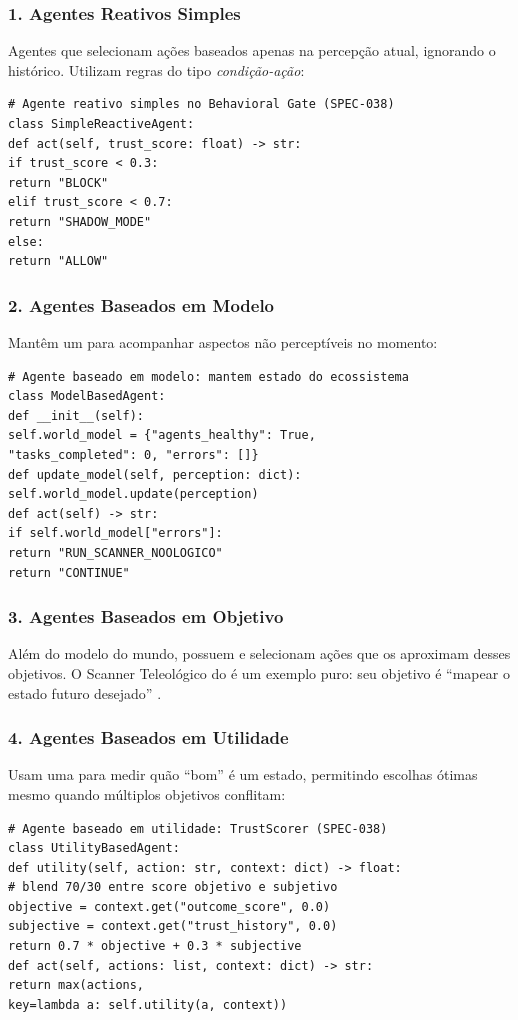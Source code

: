 \subsubsection*{1. Agentes Reativos Simples}
Agentes que selecionam ações baseados apenas na percepção atual, ignorando
o histórico. Utilizam regras do tipo \textit{condição-ação}:
\begin{lstlisting}[style=pythonstyle]
# Agente reativo simples no Behavioral Gate (SPEC-038)
class SimpleReactiveAgent:
def act(self, trust_score: float) -> str:
if trust_score < 0.3:
return "BLOCK"
elif trust_score < 0.7:
return "SHADOW_MODE"
else:
return "ALLOW"
\end{lstlisting}
\subsubsection*{2. Agentes Baseados em Modelo}
Mantêm um  para acompanhar aspectos não
perceptíveis no momento:
\begin{lstlisting}[style=pythonstyle]
# Agente baseado em modelo: mantem estado do ecossistema
class ModelBasedAgent:
def __init__(self):
self.world_model = {"agents_healthy": True,
"tasks_completed": 0, "errors": []}
def update_model(self, perception: dict):
self.world_model.update(perception)
def act(self) -> str:
if self.world_model["errors"]:
return "RUN_SCANNER_NOOLOGICO"
return "CONTINUE"
\end{lstlisting}
\subsubsection*{3. Agentes Baseados em Objetivo}
Além do modelo do mundo, possuem  e
selecionam ações que os aproximam desses objetivos. O Scanner Teleológico
do \opencodeeco{} é um exemplo puro: seu objetivo é ``mapear o estado futuro
desejado'' \cite{opencode2026scanner}.
\subsubsection*{4. Agentes Baseados em Utilidade}
Usam uma  para medir quão ``bom'' é um estado,
permitindo escolhas ótimas mesmo quando múltiplos objetivos conflitam:
\begin{lstlisting}[style=pythonstyle]
# Agente baseado em utilidade: TrustScorer (SPEC-038)
class UtilityBasedAgent:
def utility(self, action: str, context: dict) -> float:
# blend 70/30 entre score objetivo e subjetivo
objective = context.get("outcome_score", 0.0)
subjective = context.get("trust_history", 0.0)
return 0.7 * objective + 0.3 * subjective
def act(self, actions: list, context: dict) -> str:
return max(actions,
key=lambda a: self.utility(a, context))
\end{lstlisting}
